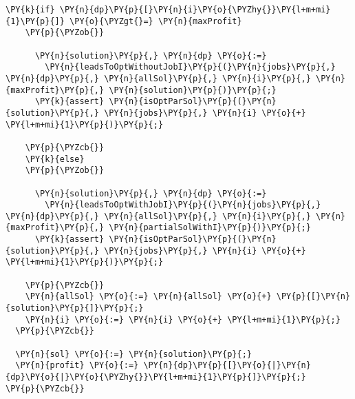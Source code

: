 \begin{Verbatim}[commandchars=\\\{\}, fontsize=\small]
    \PY{k}{if} \PY{n}{dp}\PY{p}{[}\PY{n}{i}\PY{o}{\PYZhy{}}\PY{l+m+mi}{1}\PY{p}{]} \PY{o}{\PYZgt{}=} \PY{n}{maxProfit}
    \PY{p}{\PYZob{}}

      \PY{n}{solution}\PY{p}{,} \PY{n}{dp} \PY{o}{:=}
        \PY{n}{leadsToOptWithoutJobI}\PY{p}{(}\PY{n}{jobs}\PY{p}{,} \PY{n}{dp}\PY{p}{,} \PY{n}{allSol}\PY{p}{,} \PY{n}{i}\PY{p}{,} \PY{n}{maxProfit}\PY{p}{,} \PY{n}{solution}\PY{p}{)}\PY{p}{;}
      \PY{k}{assert} \PY{n}{isOptParSol}\PY{p}{(}\PY{n}{solution}\PY{p}{,} \PY{n}{jobs}\PY{p}{,} \PY{n}{i} \PY{o}{+} \PY{l+m+mi}{1}\PY{p}{)}\PY{p}{;}

    \PY{p}{\PYZcb{}}
    \PY{k}{else}
    \PY{p}{\PYZob{}}

      \PY{n}{solution}\PY{p}{,} \PY{n}{dp} \PY{o}{:=} 
        \PY{n}{leadsToOptWithJobI}\PY{p}{(}\PY{n}{jobs}\PY{p}{,} \PY{n}{dp}\PY{p}{,} \PY{n}{allSol}\PY{p}{,} \PY{n}{i}\PY{p}{,} \PY{n}{maxProfit}\PY{p}{,} \PY{n}{partialSolWithI}\PY{p}{)}\PY{p}{;}
      \PY{k}{assert} \PY{n}{isOptParSol}\PY{p}{(}\PY{n}{solution}\PY{p}{,} \PY{n}{jobs}\PY{p}{,} \PY{n}{i} \PY{o}{+} \PY{l+m+mi}{1}\PY{p}{)}\PY{p}{;}

    \PY{p}{\PYZcb{}}
    \PY{n}{allSol} \PY{o}{:=} \PY{n}{allSol} \PY{o}{+} \PY{p}{[}\PY{n}{solution}\PY{p}{]}\PY{p}{;} 
    \PY{n}{i} \PY{o}{:=} \PY{n}{i} \PY{o}{+} \PY{l+m+mi}{1}\PY{p}{;}
  \PY{p}{\PYZcb{}}

  \PY{n}{sol} \PY{o}{:=} \PY{n}{solution}\PY{p}{;}
  \PY{n}{profit} \PY{o}{:=} \PY{n}{dp}\PY{p}{[}\PY{o}{|}\PY{n}{dp}\PY{o}{|}\PY{o}{\PYZhy{}}\PY{l+m+mi}{1}\PY{p}{]}\PY{p}{;} 
\PY{p}{\PYZcb{}}
\end{Verbatim}


